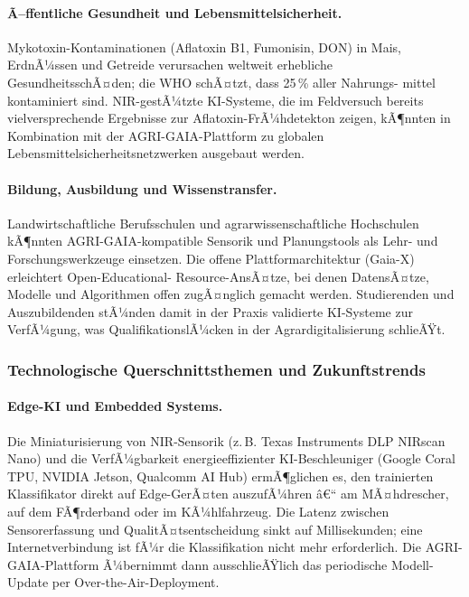 ﻿\documentclass[12pt,a4paper]{article}
\theoremstyle{plain}
\theoremstyle{definition}
\begin{document}
	\paragraph{Ã–ffentliche Gesundheit und Lebensmittelsicherheit.}
	Mykotoxin-Kontaminationen (Aflatoxin B1, Fumonisin, DON) in Mais,
	ErdnÃ¼ssen und Getreide verursachen weltweit erhebliche
	GesundheitsschÃ¤den; die WHO schÃ¤tzt, dass 25\,\% aller Nahrungs-
	mittel kontaminiert sind. NIR-gestÃ¼tzte KI-Systeme, die im
	Feldversuch bereits vielversprechende Ergebnisse zur
	Aflatoxin-FrÃ¼hdetekton zeigen, kÃ¶nnten in Kombination mit der
	AGRI-GAIA-Plattform zu globalen Lebensmittelsicherheitsnetzwerken
	ausgebaut werden.

	\paragraph{Bildung, Ausbildung und Wissenstransfer.}
	Landwirtschaftliche Berufsschulen und agrarwissen\-schaftliche
	Hochschulen kÃ¶nnten AGRI-GAIA-kompatible Sensorik und Planungstools
	als Lehr- und Forschungswerkzeuge einsetzen. Die offene
	Plattformarchitektur (Gaia-X) erleichtert Open-Educational-
	Resource-AnsÃ¤tze, bei denen DatensÃ¤tze, Modelle und
	Algorithmen offen zugÃ¤nglich gemacht werden. Studierenden
	und Auszubildenden stÃ¼nden damit in der Praxis validierte
	KI-Systeme zur VerfÃ¼gung, was QualifikationslÃ¼cken in der
	Agrardigitalisierung schlieÃŸt.

	\subsubsection{Technologische Querschnittsthemen und Zukunftstrends}

	\paragraph{Edge-KI und Embedded Systems.}
	Die Miniaturisierung von NIR-Sensorik (z.\,B. Texas Instruments
	DLP NIRscan Nano) und die VerfÃ¼gbarkeit energieeffizienter
	KI-Beschleuniger (Google Coral TPU, NVIDIA Jetson, Qualcomm AI Hub)
	ermÃ¶glichen es, den trainierten Klassifikator direkt auf Edge-GerÃ¤ten
	auszufÃ¼hren â€“ am MÃ¤hdrescher, auf dem FÃ¶rderband oder im KÃ¼hlfahrzeug.
	Die Latenz zwischen Sensorerfassung und QualitÃ¤tsentscheidung
	sinkt auf Millisekunden; eine Internetverbindung ist fÃ¼r die
	Klassifikation nicht mehr erforderlich. Die AGRI-GAIA-Plattform
	Ã¼bernimmt dann ausschlieÃŸlich das periodische Modell-Update
	per Over-the-Air-Deployment.
\end{document}
